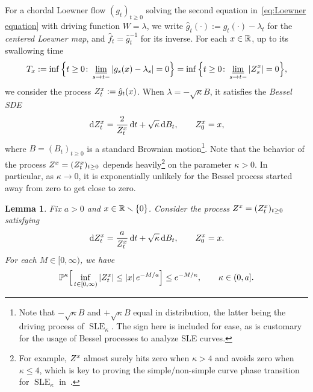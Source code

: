 \documentclass[a4paper, 11pt]{article}
\newtheorem{lem}[thm]{Lemma}
\theoremstyle{definition}
\numberwithin{equation}{section}
\numberwithin{figure}{section}
\renewcommand{\liminf}{\varliminf}
\newcommand{\SLE}[1][]{\operatorname{SLE}_{#1}}
\newcommand{\bessel}[1][]{{\ifx&#1&\else{^{#1 \!}}\fi}Z}
\newcommand{\BMmeasure}[2][]{\bP^{#2}_{\!#1}}
\begin{document}
For a chordal Loewner flow $(g_t)_{t \ge 0}$ solving
the second equation in~\eqref{eq:Loewner equation} with driving function $W = \lambda$, 
we write $\hat g_t(\cdot) := g_t(\cdot) - \lambda_t$ for the \emph{centered Loewner map}, 
and $\hat f_t = \hat g_t^{-1}$ for its inverse. 
For each $x \in \mathbb{R}$, up to its swallowing time 
\begin{align*} 
T_x := \inf \Big\{t \ge 0 \colon \liminf_{s \to t-} |g_s(x) - \lambda_s|  = 0  \Big\}
= \inf \Big\{t \ge 0 \colon \liminf_{s \to t-} |\bessel^x_s|  = 0  \Big\} ,
\end{align*}
we consider the process $\bessel^x_t := \hat g_t(x)$. 
When $\lambda = - \sqrt{\kappa} B$, it satisfies the \emph{Bessel SDE}
\begin{align*}
\ud\bessel^x_t = \frac{2}{\bessel^x_t}\ud t + \sqrt\kappa\ud B_t, \qquad \bessel^x_0 = x ,
\end{align*}
where $B = (B_t)_{t \ge 0}$ is a standard Brownian motion\footnote{Note that $- \sqrt{\kappa} B$ and $+ \sqrt{\kappa} B$ equal in distribution, the latter being the driving process of $\SLE[\kappa]$. 
The sign here is included for ease, as is customary for the usage of Bessel processes to analyze SLE curves.}. 
Note that the behavior of the process $\bessel^x = (\bessel^x_t)_{t \ge 0}$ depends heavily\footnote{For example, $\bessel^x$ almost surely hits zero when $\kappa > 4$ and avoids zero when $\kappa \leq 4$, which is key to proving the simple/non-simple curve phase transition for $\SLE[\kappa]$ in~\cite{Rohde-Schramm:Basic_properties_of_SLE}.} 
on the parameter $\kappa > 0$. 
In particular, as $\kappa \to 0$, it is exponentially unlikely for the Bessel process started away from zero to get close to zero. 

\begin{lem}\label{thm:harmonic-measure-gets-small-estimate}
Fix $a > 0$ and $x \in \mathbb{R} \smallsetminus \{0\}$. 
Consider the process 
$\bessel^x = (\bessel^x_t)_{t \ge 0}$ satisfying 
\begin{align} \label{eq:Bessel_general}
\ud\bessel^x_t = \frac{a}{\bessel^x_t}\ud t + \sqrt\kappa\ud B_t, \qquad \bessel^x_0 = x .
\end{align}
For each $M \in [0,\infty)$, we have
\begin{align}\label{eq:harmonic-measure-gets-small-estimate}
\BMmeasure{\kappa}\Big[\inf_{t \in [0,\infty)} |\bessel^x_t| \le |x| \, e^{-M/a}\Big] \le e^{-M/\kappa} , \qquad \kappa \in (0,a] .
\end{align}
\end{lem}
\end{document}

